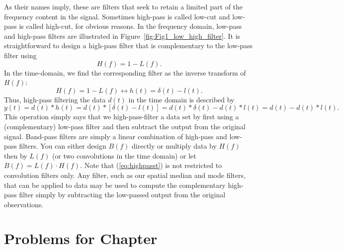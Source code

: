 As their names imply, these are filters that seek to retain a limited part of the frequency
content in the signal. Sometimes high-pass is called low-cut and low-pass is called high-cut,
for obvious reasons. In the frequency domain, low-pass and high-pass filters are illustrated
in Figure~\ref{fig:Fig1_low_high_filter}.
It is straightforward to design a high-pass filter that is complementary to the low-pass filter using
\begin{equation}
H (f) = 1 - L (f).
\label{eq:highpassf}
\end{equation}
In the time-domain, we find the corresponding filter as the inverse transform of $H(f)$:
\begin{equation}
H (f) = 1 - L (f) \leftrightarrow h(t) = \delta (t) - l (t).
\label{eq:highpasst}
\end{equation}
Thus, high-pass filtering the data $d(t)$ in the time domain is described by
$$
y(t) = d(t) * h (t) = d(t)* [\delta (t) - l(t)]
= d(t)* \delta (t)- d(t)* l (t) = d(t) - d(t) * l(t).
$$
This operation simply says that we high-pass-filter a data set by first using a (complementary) low-pass
filter and then subtract the output from the original signal.
Band-pass filters are simply a linear combination of high-pass and low-pass filters. You can
either design $B(f)$ directly or multiply data by $H(f)$ then by $L(f)$ (or two convolutions in
the time domain) or let $B(f) = L(f)\cdot H(f)$.
Note that (\ref{eq:highpasst}) is not restricted to convolution filters only.  Any filter, such as
our spatial median and mode filters, that can
be applied to data may be used to compute the complementary high-pass filter simply by subtracting
the low-passed output from the original observations.


\clearpage
\section{Problems for Chapter \thechapter}

